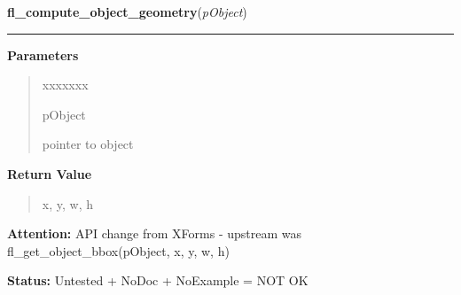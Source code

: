 \hspace{.8\funcindent}\begin{boxedminipage}{\funcwidth}

    \raggedright \textbf{fl\_compute\_object\_geometry}(\textit{pObject})

    \vspace{-1.5ex}

    \rule{\textwidth}{0.5\fboxrule}
\setlength{\parskip}{2ex}
\setlength{\parskip}{1ex}
      \textbf{Parameters}
      \vspace{-1ex}

      \begin{quote}
        \begin{Ventry}{xxxxxxx}

          \item[pObject]

          pointer to object

        \end{Ventry}

      \end{quote}

      \textbf{Return Value}
    \vspace{-1ex}

      \begin{quote}
      x, y, w, h

      \end{quote}

\textbf{Attention:} API change from XForms - upstream was fl\_get\_object\_bbox(pObject, x, y, 
w, h)



\textbf{Status:} Untested + NoDoc + NoExample = NOT OK



    \end{boxedminipage}

    \label{xformslib:library:fl_call_object_callback}

    \vspace{0.5ex}

